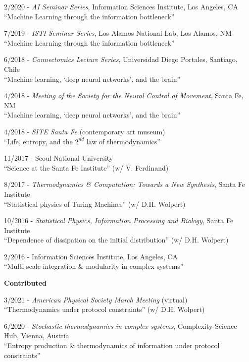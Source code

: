 \documentclass[margin,line,centered]{res}
\begin{document}
\begin{resume}
2/2020 - \emph{AI Seminar Series}, Information Sciences Institute, Los Angeles, CA\\
``Machine Learning through the information bottleneck'' %

7/2019 - \emph{ISTI Seminar Series}, Los Alamos National Lab, Los Alamos, NM\\
``Machine Learning through the information bottleneck''  %


6/2018 - \emph{Connectomics Lecture Series}, Universidad Diego Portales, Santiago, Chile\\
``Machine learning, `deep neural networks', and the brain''  %

4/2018 - \emph{Meeting of the Society for the Neural Control of Movement}, Santa Fe, NM\\
``Machine learning, `deep neural networks', and the brain''

4/2018 - \emph{SITE Santa Fe} (contemporary art museum)\\
``Life, entropy, and the $2^{{nd}}$ law of thermodynamics''

11/2017 - Seoul National University\\
``Science at the Santa Fe Institute'' (w/ V. Ferdinand) %

8/2017 - \emph{Thermodynamics \& Computation: Towards a New Synthesis}, Santa Fe Institute\\
``Statistical physics of Turing Machines'' (w/ D.H. Wolpert) %

10/2016 - \emph{Statistical Physics, Information Processing and Biology}, Santa Fe Institute \\
``Dependence of dissipation on the initial distribution'' (w/ D.H. Wolpert) %

2/2016 - Information Sciences Institute, Los Angeles, CA\\
``Multi-scale integration \& modularity in complex systems'' %


\vspace{5pt}

\textbf{Contributed}

3/2021 - \emph{American Physical Society March Meeting} (virtual)\\
``Thermodynamics under protocol constraints'' (w/ D.H. Wolpert)%

6/2020 - \emph{Stochastic thermodynamics in complex systems}, Complexity Science Hub, Vienna, Austria\\
``Entropy production \& thermodynamics of information under protocol constraints''


\end{resume}
\end{document}
